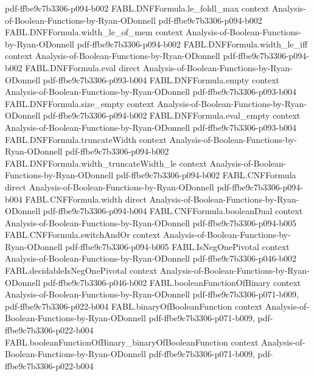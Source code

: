 \begin{theorem}
  {pdf-ffbe9c7b3306-p094-b002}
\proofstep
  {FABL.DNFFormula.le_foldl_max}
  {context}
  {Analysis-of-Boolean-Functions-by-Ryan-ODonnell}
  {pdf-ffbe9c7b3306-p094-b002}
\proofstep
  {FABL.DNFFormula.width_le_of_mem}
  {context}
  {Analysis-of-Boolean-Functions-by-Ryan-ODonnell}
  {pdf-ffbe9c7b3306-p094-b002}
\proofstep
  {FABL.DNFFormula.width_le_iff}
  {context}
  {Analysis-of-Boolean-Functions-by-Ryan-ODonnell}
  {pdf-ffbe9c7b3306-p094-b002}
\proofstep
  {FABL.DNFFormula.eval}
  {direct}
  {Analysis-of-Boolean-Functions-by-Ryan-ODonnell}
  {pdf-ffbe9c7b3306-p093-b004}
\proofstep
  {FABL.DNFFormula.empty}
  {context}
  {Analysis-of-Boolean-Functions-by-Ryan-ODonnell}
  {pdf-ffbe9c7b3306-p093-b004}
\proofstep
  {FABL.DNFFormula.size_empty}
  {context}
  {Analysis-of-Boolean-Functions-by-Ryan-ODonnell}
  {pdf-ffbe9c7b3306-p094-b002}
\proofstep
  {FABL.DNFFormula.eval_empty}
  {context}
  {Analysis-of-Boolean-Functions-by-Ryan-ODonnell}
  {pdf-ffbe9c7b3306-p093-b004}
\proofstep
  {FABL.DNFFormula.truncateWidth}
  {context}
  {Analysis-of-Boolean-Functions-by-Ryan-ODonnell}
  {pdf-ffbe9c7b3306-p094-b002}
\proofstep
  {FABL.DNFFormula.width_truncateWidth_le}
  {context}
  {Analysis-of-Boolean-Functions-by-Ryan-ODonnell}
  {pdf-ffbe9c7b3306-p094-b002}
\proofstep
  {FABL.CNFFormula}
  {direct}
  {Analysis-of-Boolean-Functions-by-Ryan-ODonnell}
  {pdf-ffbe9c7b3306-p094-b004}
\proofstep
  {FABL.CNFFormula.width}
  {direct}
  {Analysis-of-Boolean-Functions-by-Ryan-ODonnell}
  {pdf-ffbe9c7b3306-p094-b004}
\proofstep
  {FABL.CNFFormula.booleanDual}
  {context}
  {Analysis-of-Boolean-Functions-by-Ryan-ODonnell}
  {pdf-ffbe9c7b3306-p094-b005}
\proofstep
  {FABL.CNFFormula.switchAndOr}
  {context}
  {Analysis-of-Boolean-Functions-by-Ryan-ODonnell}
  {pdf-ffbe9c7b3306-p094-b005}
\proofstep
  {FABL.IsNegOnePivotal}
  {context}
  {Analysis-of-Boolean-Functions-by-Ryan-ODonnell}
  {pdf-ffbe9c7b3306-p046-b002}
\proofstep
  {FABL.decidableIsNegOnePivotal}
  {context}
  {Analysis-of-Boolean-Functions-by-Ryan-ODonnell}
  {pdf-ffbe9c7b3306-p046-b002}
\proofstep
  {FABL.booleanFunctionOfBinary}
  {context}
  {Analysis-of-Boolean-Functions-by-Ryan-ODonnell}
  {pdf-ffbe9c7b3306-p071-b009,
    pdf-ffbe9c7b3306-p022-b004}
\proofstep
  {FABL.binaryOfBooleanFunction}
  {context}
  {Analysis-of-Boolean-Functions-by-Ryan-ODonnell}
  {pdf-ffbe9c7b3306-p071-b009,
    pdf-ffbe9c7b3306-p022-b004}
\proofstep
  {FABL.booleanFunctionOfBinary_binaryOfBooleanFunction}
  {context}
  {Analysis-of-Boolean-Functions-by-Ryan-ODonnell}
  {pdf-ffbe9c7b3306-p071-b009,
    pdf-ffbe9c7b3306-p022-b004}
\proofstep

\end{theorem}
